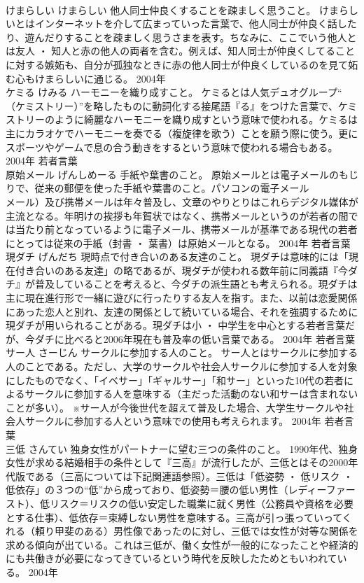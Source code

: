 \documentclass[8pt]{extreport}
\begin{document}
\begin{CJK}{UTF8}{min}
\\	けまらしい	けまらしい	他人同士仲良くすることを疎ましく思うこと。	けまらしいとはインターネットを介して広まっていった言葉で、他人同士が仲良く話したり、遊んだりすることを疎ましく思うさまを表す。ちなみに、ここでいう他人とは友人 ・ 知人と赤の他人の両者を含む。例えば、知人同士が仲良くしてることに対する嫉妬も、自分が孤独なときに赤の他人同士が仲良くしているのを見て妬む心もけまらしいに通じる。	2004年	
\\	ケミる	けみる	ハーモニーを織り成すこと。	ケミるとは人気デュオグループ“
\\	（ケミストリー）”を略したものに動詞化する接尾語『る』をつけた言葉で、ケミストリーのように綺麗なハーモニーを織り成すという意味で使われる。ケミるは主にカラオケでハーモニーを奏でる（複旋律を歌う）ことを願う際に使う。更にスポーツやゲームで息の合う動きをするという意味で使われる場合もある。	2004年	若者言葉	
\\	原始メール	げんしめーる	手紙や葉書のこと。	原始メールとは電子メールのもじりで、従来の郵便を使った手紙や葉書のこと。パソコンの電子メール
\\	メール）及び携帯メールは年々普及し、文章のやりとりはこれらデジタル媒体が主流となる。年明けの挨拶も年賀状ではなく、携帯メールというのが若者の間では当たり前となっているように電子メール、携帯メールが基準である現代の若者にとっては従来の手紙（封書 ・ 葉書）は原始メールとなる。	2004年	若者言葉	
\\	現ダチ	げんだち	現時点で付き合いのある友達のこと。	現ダチは意味的には「現在付き合いのある友達」の略であるが、現ダチが使われる数年前に同義語『今ダチ』が普及していることを考えると、今ダチの派生語とも考えられる。現ダチは主に現在進行形で一緒に遊びに行ったりする友人を指す。また、以前は恋愛関係にあった恋人と別れ、友達の関係として続いている場合、それを強調するために現ダチが用いられることがある。現ダチは小 ・ 中学生を中心とする若者言葉だが、今ダチに比べると2006年現在も普及率の低い言葉である。	2004年	若者言葉	
\\	サー人	さーじん	サークルに参加する人のこと。	サー人とはサークルに参加する人のことである。ただし、大学のサークルや社会人サークルに参加する人を対象にしたものでなく、「イベサー」「ギャルサー」「和サー」といった10代の若者によるサークルに参加する人を意味する（主だった活動のない和サーは含まれないことが多い）。 ※サー人が今後世代を超えて普及した場合、大学生サークルや社会人サークルに参加する人という意味での使用も考えられます。	2004年	若者言葉	
\\	三低	さんてい	独身女性がパートナーに望む三つの条件のこと。	1990年代、独身女性が求める結婚相手の条件として『三高』が流行したが、三低とはその2000年代版である（三高については下記関連語参照）。三低は「低姿勢 ・ 低リスク ・ 低依存」の３つの“低”から成っており、低姿勢＝腰の低い男性（レディーファースト）、低リスク＝リスクの低い安定した職業に就く男性（公務員や資格を必要とする仕事）、低依存＝束縛しない男性を意味する。三高が引っ張っていってくれる（頼り甲斐のある）男性像であったのに対し、三低では女性が対等な関係を求める傾向が出ている。これは三低が、働く女性が一般的になったことや経済的にも共働きが必要になってきているという時代を反映したためともいわれている。	2004年	

\end{CJK}
\end{document}
